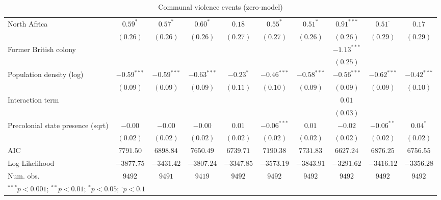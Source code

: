 \begin{sidewaystable}
\begin{center}
{\begin{tabular}{l c c c c c c c c c}
North Africa                          & $0.59^{*}$    & $0.57^{*}$    & $0.60^{*}$    & $0.18$        & $0.55^{*}$      & $0.51^{*}$    & $0.91^{***}$  & $0.51^{\cdot}$ & $0.17$        \\
                                      & $(0.26)$      & $(0.26)$      & $(0.26)$      & $(0.27)$      & $(0.27)$        & $(0.26)$      & $(0.26)$      & $(0.29)$       & $(0.29)$      \\
Former British colony                 &               &               &               &               &                 &               & $-1.13^{***}$ &                &               \\
                                      &               &               &               &               &                 &               & $(0.25)$      &                &               \\
Population density (log)              & $-0.59^{***}$ & $-0.59^{***}$ & $-0.63^{***}$ & $-0.23^{*}$   & $-0.46^{***}$   & $-0.58^{***}$ & $-0.56^{***}$ & $-0.62^{***}$  & $-0.42^{***}$ \\
                                      & $(0.09)$      & $(0.09)$      & $(0.09)$      & $(0.11)$      & $(0.10)$        & $(0.09)$      & $(0.09)$      & $(0.09)$       & $(0.10)$      \\
Interaction term                      &               &               &               &               &                 &               & $0.01$        &                &               \\
                                      &               &               &               &               &                 &               & $(0.03)$      &                &               \\
Precolonial state presence (sqrt)     & $-0.00$       & $-0.00$       & $-0.00$       & $0.01$        & $-0.06^{***}$   & $0.01$        & $-0.02$       & $-0.06^{**}$   & $0.04^{*}$    \\
                                      & $(0.02)$      & $(0.02)$      & $(0.02)$      & $(0.02)$      & $(0.02)$        & $(0.02)$      & $(0.02)$      & $(0.02)$       & $(0.02)$      \\
\midrule
AIC                                   & $7791.50$     & $6898.84$     & $7650.49$     & $6739.71$     & $7190.38$       & $7731.83$     & $6627.24$     & $6876.25$      & $6756.55$     \\
Log Likelihood                        & $-3877.75$    & $-3431.42$    & $-3807.24$    & $-3347.85$    & $-3573.19$      & $-3843.91$    & $-3291.62$    & $-3416.12$     & $-3356.28$    \\
Num. obs.                             & $9492$        & $9491$        & $9419$        & $9492$        & $9492$          & $9492$        & $9492$        & $9492$         & $9492$        \\
\bottomrule
\multicolumn{10}{l}{\scriptsize{$^{***}p<0.001$; $^{**}p<0.01$; $^{*}p<0.05$; $^{\cdot}p<0.1$}}
\end{tabular}
}
\caption{Communal violence events (zero-model)}
\label{zorg3}
\end{center}
\end{sidewaystable}
